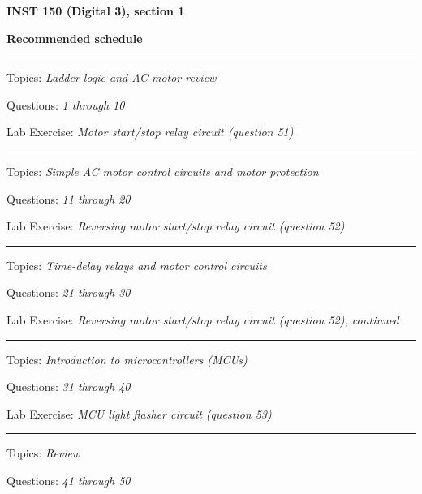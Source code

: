 
\centerline{\bf INST 150 (Digital 3), section 1} \bigskip 
 
\vskip 10pt

\noindent
{\bf Recommended schedule}

\vskip 5pt

\hrule \vskip 5pt
\noindent
{}

\hskip 10pt Topics: {\it Ladder logic and AC motor review}
 
\hskip 10pt Questions: {\it 1 through 10}
 
\hskip 10pt Lab Exercise: {\it Motor start/stop relay circuit (question 51)}
 


\vskip 10pt
\hrule \vskip 5pt
\noindent
{}

\hskip 10pt Topics: {\it Simple AC motor control circuits and motor protection}
 
\hskip 10pt Questions: {\it 11 through 20}
 
\hskip 10pt Lab Exercise: {\it Reversing motor start/stop relay circuit (question 52)}
 

\vskip 10pt
\hrule \vskip 5pt
\noindent
{}

\hskip 10pt Topics: {\it Time-delay relays and motor control circuits}
 
\hskip 10pt Questions: {\it 21 through 30}
 
\hskip 10pt Lab Exercise: {\it Reversing motor start/stop relay circuit (question 52), continued}
 
\vskip 10pt
\hrule \vskip 5pt
\noindent
{}

\hskip 10pt Topics: {\it Introduction to microcontrollers (MCUs)}
 
\hskip 10pt Questions: {\it 31 through 40}
 
\hskip 10pt Lab Exercise: {\it MCU light flasher circuit (question 53)}
 
\vskip 10pt
\hrule \vskip 5pt
\noindent
{}

\hskip 10pt Topics: {\it Review}
 
\hskip 10pt Questions: {\it 41 through 50}
 
